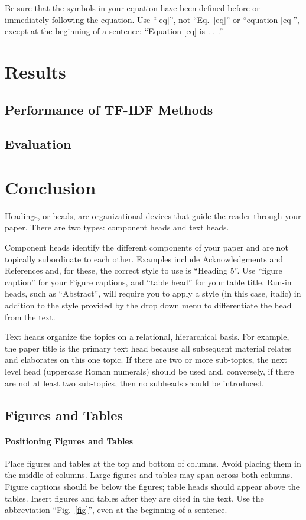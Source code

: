 \documentclass[conference]{IEEEtran}
\begin{document}
Be sure that the 
symbols in your equation have been defined before or immediately following 
the equation. Use ``\eqref{eq}'', not ``Eq.~\eqref{eq}'' or ``equation \eqref{eq}'', except at 
the beginning of a sentence: ``Equation \eqref{eq} is . . .''

\section{Results}
\subsection{Performance of TF-IDF Methods}\label{AA}
\subsection{Evaluation}\label{AA}


\section{Conclusion}
Headings, or heads, are organizational devices that guide the reader through 
your paper. There are two types: component heads and text heads.

Component heads identify the different components of your paper and are not 
topically subordinate to each other. Examples include Acknowledgments and 
References and, for these, the correct style to use is ``Heading 5''. Use 
``figure caption'' for your Figure captions, and ``table head'' for your 
table title. Run-in heads, such as ``Abstract'', will require you to apply a 
style (in this case, italic) in addition to the style provided by the drop 
down menu to differentiate the head from the text.

Text heads organize the topics on a relational, hierarchical basis. For 
example, the paper title is the primary text head because all subsequent 
material relates and elaborates on this one topic. If there are two or more 
sub-topics, the next level head (uppercase Roman numerals) should be used 
and, conversely, if there are not at least two sub-topics, then no subheads 
should be introduced.

\subsection{Figures and Tables}
\paragraph{Positioning Figures and Tables} Place figures and tables at the top and 
bottom of columns. Avoid placing them in the middle of columns. Large 
figures and tables may span across both columns. Figure captions should be 
below the figures; table heads should appear above the tables. Insert 
figures and tables after they are cited in the text. Use the abbreviation 
``Fig.~\ref{fig}'', even at the beginning of a sentence.
\end{document}
